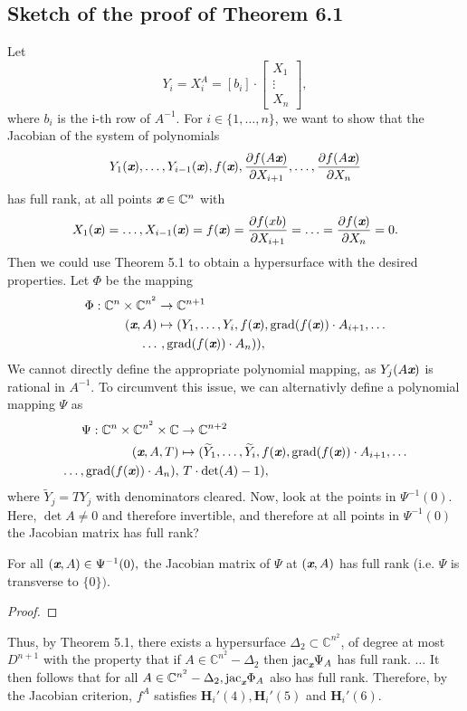 \documentclass[sigconf]{acmart}
\def\xb{\textit{\textbf{x}}}
\def\C{\mathbb{C}}
\def\jac{ \textrm{jac}}
\def\grad{\textrm{grad}}
\def\Yt{\widetilde{Y}}
\def\pa{\partial}
\def\bbm{\begin{bmatrix}}
\def\ebm{\end{bmatrix}}
\begin{document}
\subsection{Sketch of the proof of Theorem 6.1}
%
Let 
\[
Y_i = X_i^{A} = [b_i] \cdot \bbm X_1\\ \vdots \\ X_n \ebm, 
\]
where $b_i$ is the i-th row of $A^{-1}$. For $i \in \{1,\hdots,n\}$, we want to show that the Jacobian of the system of polynomials
\[
Y_1(\xb),\hdots,Y_{i-1}(\xb), f(\xb),  \frac{\pa f(A\xb)}{\pa X_{i+1}},\hdots,\frac{\pa f(A\xb)}{\pa X_n}
\]
has full rank, at all points $\xb \in \C^n$ with 
\[
X_1(\xb)=\hdots,X_{i-1}(\xb)=f(\xb)= \frac{\pa f(xb)}{\pa X_{i+1}}=\hdots = \frac{\pa f(\xb)}{\pa X_{n}}=0.
\]
Then we could use Theorem 5.1 to obtain a hypersurface with the desired properties. Let $\Phi$ be the mapping 
%
\begin{align*}
    \Phi: \C^n \times \C^{n^2} &\rightarrow \C^{n+1} \\
           (\xb,A) &\mapsto 
       (Y_1,\hdots,Y_i,f(\xb),\grad(f(\xb))\cdot A_{i+1},\hdots \\
       \hdots&~,\grad(f(\xb))\cdot A_{n})),
\end{align*}
%
We cannot directly define the appropriate polynomial mapping, as $Y_j(A\xb)$ is rational in $A^{-1}.$ To circumvent this issue, we can alternativly define a polynomial mapping $\Psi$ as  
%
\begin{align*}
    \Psi: \C^n \times \C^{n^2} \times \C &\rightarrow \C^{n+2} \\
           (\xb,A,T) &\mapsto 
       (\Yt_1,\hdots,\Yt_i,f(\xb),\grad(f(\xb))\cdot A_{i+1},\hdots \\
\hdots,\grad(f(\xb))\cdot A_{n}),&~T\cdot \det (A) - 1),
\end{align*}
%
where $\Yt_j=TY_j$ with denominators cleared. Now, look at the points in $\Psi^{-1}(0).$ Here, $\det A \not = 0$ and therefore invertible, and therefore at all points in $\Psi^{-1}(0)$ the Jacobian matrix has full rank? 
%
\begin{proposition}
For all $(\xb,A) \in \Psi^{-1}(0),$ the Jacobian matrix of $\Psi$ at $(\xb,A)$ has full rank (i.e. $\Psi$ is transverse to $\{0\}).$
\end{proposition}
%
\begin{proof}
\end{proof}
%
Thus, by Theorem 5.1, there exists a hypersurface $\Delta_2 \subset \C^{n^2}$, of degree at most $D^{n+1}$ with the property that if $A \in \C^{n^2}-\Delta_2$ then $\jac_{\xb}\Psi_A$ has full rank. $\hdots$ It then follows that for all $A \in \C^{n^2}-\Delta_2, \jac_{\xb}\Phi_A$ also has full rank. Therefore, by the Jacobian criterion, $f^A$ satisfies  $\textbf{H}_i'(4),\textbf{H}_i'(5)$ and $\textbf{H}_i'(6)$. 
%
%
%
%
\end{document}
